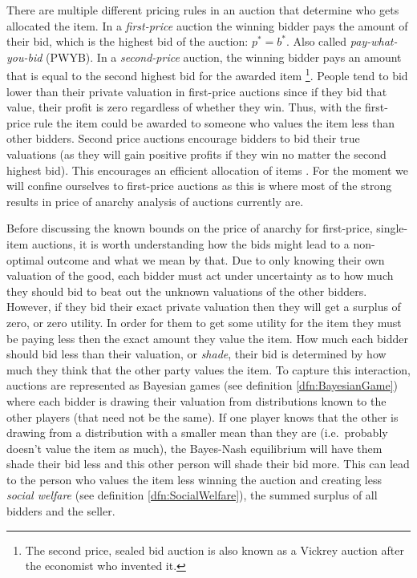 \documentclass[12pt,twoside]{reedthesis}
\begin{document}
There are multiple different pricing rules in an auction that determine who gets allocated the item. In a {\em first-price} auction the winning bidder pays the amount of their bid, which is the highest bid of the auction: $p^* = b^*$. Also called {\em pay-what-you-bid} (PWYB). In a {\em second-price} auction, the winning bidder pays an amount that is equal to the second highest bid for the awarded item \citep{Vickrey1961} \footnote{The second price, sealed bid auction is also known as a Vickrey auction after the economist who invented it.}. People tend to bid lower than their private valuation in first-price auctions since if they bid that value, their profit is zero regardless of whether they win. Thus, with the first-price rule the item could be awarded to someone who values the item less than other bidders. Second price auctions encourage bidders to bid their true valuations (as they will gain positive profits if they win no matter the second highest bid). This encourages an efficient allocation of items \citep{Mochon2015}. For the moment we will confine ourselves to first-price auctions as this is where most of the strong results in price of anarchy analysis of auctions currently are.

Before discussing the known bounds on the price of anarchy for first-price, single-item auctions, it is worth understanding how the bids might lead to a non-optimal outcome and what we mean by that. Due to only knowing their own valuation of the good, each bidder must act under uncertainty as to how much they should bid to beat out the unknown valuations of the other bidders. However, if they bid their exact private valuation then they will get a surplus of zero, or zero utility. In order for them to get some utility for the item they must be paying less then the exact amount they value the item. How much each bidder should bid less than their valuation, or {\em shade}, their bid is determined by how much they think that the other party values the item. To capture this interaction, auctions are represented as Bayesian games (see definition \ref{dfn:BayesianGame}) where each bidder is drawing their valuation from distributions known to the other players (that need not be the same). If one player knows that the other is drawing from a distribution with a smaller mean than they are (i.e.~probably doesn't value the item as much), the Bayes-Nash equilibrium will have them shade their bid less and this other person will shade their bid more. This can lead to the person who values the item less winning the auction and creating less {\em social welfare} (see definition \ref{dfn:SocialWelfare}), the summed surplus of all bidders and the seller. 
\end{document}
